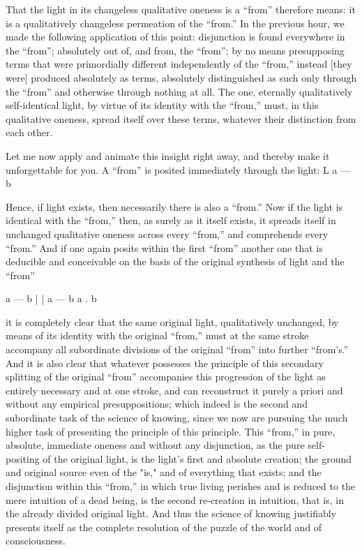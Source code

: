 That the light in its changeless qualitative oneness
is a “from” therefore means:
it is a qualitatively changeless
permeation of the “from.”
In the previous hour,
we made the following application of this point:
disjunction is found everywhere in the “from”;
absolutely out of, and from, the “from”;
by no means presupposing terms
that were primordially different
independently of the “from,”
instead [they were] produced absolutely as terms,
absolutely distinguished as such
only through the “from”
and otherwise through nothing at all.
The one, eternally qualitatively self-identical light,
by virtue of its identity with the “from,”
must, in this qualitative oneness,
spread itself over these terms,
whatever their distinction from each other.

Let me now apply and animate this insight right away,
and thereby make it unforgettable for you.
A “from” is posited immediately through the light:
L
a — b

Hence, if light exists,
then necessarily there is also a “from.”
Now if the light is identical with the “from,”
then, as surely as it itself exists,
it spreads itself in unchanged qualitative oneness
across every “from,” and comprehends every “from.”
And if one again posits within the first “from”
another one that is deducible and conceivable
on the basis of the original synthesis of
light and the “from”

a — b
|
|
a — b  a . b

it is completely clear that
the same original light, qualitatively unchanged,
by means of its identity with the original “from,”
must at the same stroke accompany
all subordinate divisions of
the original “from” into further “from's.”
And it is also clear that whatever possesses
the principle of this secondary splitting
of the original “from” accompanies
this progression of the light
as entirely necessary and at one stroke,
and can reconstruct it purely a priori
and without any empirical presuppositions;
which indeed is the second and subordinate task
of the science of knowing,
since we now are pursuing the much higher task
of presenting the principle of this principle.
This “from,” in pure, absolute, immediate oneness
and without any disjunction,
as the pure self-positing of the original light,
is the light's first and absolute creation;
the ground and original source even of the "is,"
and of everything that exists;
and the disjunction within this “from,”
in which true living perishes
and is reduced to the mere intuition of a dead being,
is the second re-creation in intuition,
that is, in the already divided original light.
And thus the science of knowing
justifiably presents itself
as the complete resolution of
the puzzle of the world
and of consciousness.

